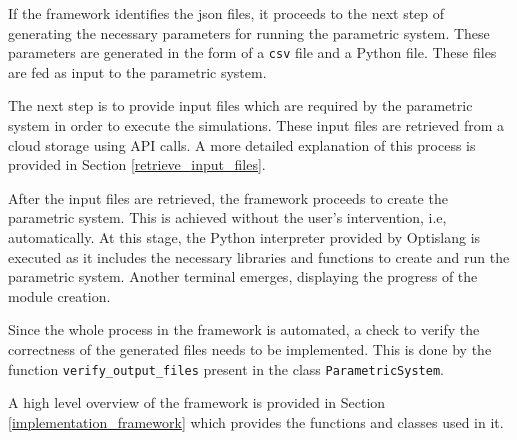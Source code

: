 If the framework identifies the \acrshort{json} files, it proceeds to the next step of generating the necessary parameters for running the parametric system. 
These parameters are generated in the form of a \texttt{csv} file and a Python file. These files are fed as input to the parametric system. 

The next step is to provide input files which are required by the parametric system in order to execute the simulations. These input files are retrieved from 
a cloud storage using API calls. A more detailed explanation of this process is provided in Section \ref{retrieve_input_files}. 

After the input files are retrieved, the framework proceeds to create the parametric system. This is achieved without the user's intervention, i.e, 
automatically. At this stage, the Python interpreter provided by Optislang is executed as it includes the necessary libraries and functions to create and run 
the parametric system. Another terminal emerges, displaying the progress of the module creation.

Since the whole process in the framework is automated, a check to verify the correctness of the generated files needs to be implemented. This is done by the 
function \texttt{verify\_output\_files} present in the class \texttt{ParametricSystem}. 

A high level overview of the framework is provided in Section \ref{implementation_framework} which provides the functions and classes used in it. 
